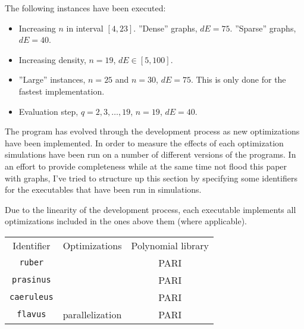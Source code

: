 \documentclass[a4paper]{article}
\newcommand{\code}{\texttt}
\begin{document}

The following instances have been executed:

\begin{itemize}
 \item Increasing $n$ in interval $[4, 23]$.
 \subitem ''Dense'' graphs, $dE = 75$.
 \subitem ''Sparse'' graphs, $dE = 40$.
 \item Increasing density, $n = 19$, $dE \in [5, 100]$.
 \item ''Large'' instances, $n = 25$ and $n = 30$, $dE = 75$.
 \subitem This is only done for the fastest implementation.
 \item Evaluation step, $q = 2, 3, \ldots, 19$, $n = 19$, $dE = 40$.
\end{itemize}

The program has evolved through the development process as new optimizations have been implemented. In order to measure the effects of each optimization simulations have been run on a number of different versions of the programs. In an effort to provide completeness while at the same time not flood this paper with graphs, I've tried to structure up this section by specifying some identifiers for the executables that have been run in simulations.

Due to the linearity of the development process, each executable implements all optimizations included in the ones above them (where applicable).

\begin{tabular}{c|c|c}
 Identifier & Optimizations & Polynomial library \\
 \code{ruber} &  & PARI \\
 \code{prasinus} & & PARI \\
 \code{caeruleus} &  & PARI \\
 \code{flavus} & parallelization & PARI \\
\end{tabular}

\end{document}
